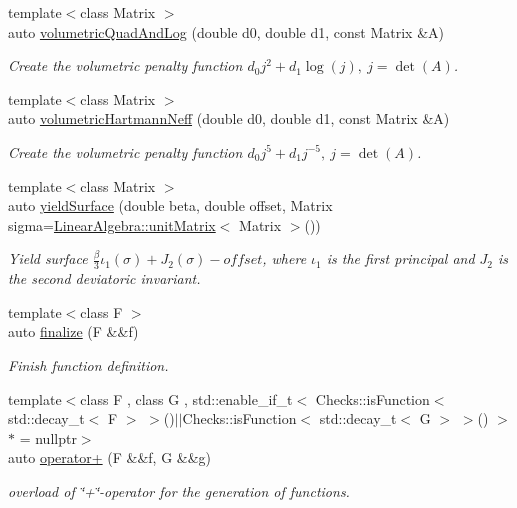 \begin{DoxyCompactItemize}
{\footnotesize template$<$class Matrix $>$ }\\auto \hyperlink{namespaceFunG_aaf30b9c36ed86e01b94f6b7c1d95cae8}{volumetric\-Quad\-And\-Log} (double d0, double d1, const \-Matrix \&\-A)
\begin{DoxyCompactList}\small\item\em \-Create the volumetric penalty function $ d_0 j^2 + d_1 \log(j),\ j=\det(A) $. \end{DoxyCompactList}\item 
{\footnotesize template$<$class Matrix $>$ }\\auto \hyperlink{namespaceFunG_adf4be5df85ea9df10cc9e11c11aaeb7b}{volumetric\-Hartmann\-Neff} (double d0, double d1, const \-Matrix \&\-A)
\begin{DoxyCompactList}\small\item\em \-Create the volumetric penalty function $ d_0 j^5 + d_1 j^{-5},\ j=\det(A) $. \end{DoxyCompactList}\item 
{\footnotesize template$<$class Matrix $>$ }\\auto \hyperlink{namespaceFunG_a4784211358c877f05ad9426850303273}{yield\-Surface} (double beta, double offset, \-Matrix sigma=\hyperlink{group__LinearAlgebraGroup_ga88a596b8526c0ed98ce241244fb85948}{\-Linear\-Algebra\-::unit\-Matrix}$<$ \-Matrix $>$())
\begin{DoxyCompactList}\small\item\em \-Yield surface $ \frac{\beta}{3}\iota_1(\sigma) + J_2(\sigma)-offset $, where $\iota_1$ is the first principal and $J_2$ is the second deviatoric invariant. \end{DoxyCompactList}\item 
{\footnotesize template$<$class F $>$ }\\auto \hyperlink{namespaceFunG_ac59f2ececc3cd451860776320a4a93d5}{finalize} (\-F \&\&f)
\begin{DoxyCompactList}\small\item\em \-Finish function definition. \end{DoxyCompactList}\item 
{\footnotesize template$<$class F , class G , std\-::enable\-\_\-if\-\_\-t$<$ Checks\-::is\-Function$<$ std\-::decay\-\_\-t$<$ F $>$ $>$()$|$$|$\-Checks\-::is\-Function$<$ std\-::decay\-\_\-t$<$ G $>$ $>$() $>$ $\ast$  = nullptr$>$ }\\auto \hyperlink{namespaceFunG_a24bb5d609b022030afda2d8589cf5509}{operator+} (\-F \&\&f, \-G \&\&g)
\begin{DoxyCompactList}\small\item\em overload of \char`\"{}+\char`\"{}-\/operator for the generation of functions. \end{DoxyCompactList}\item 

\end{DoxyCompactItemize}
